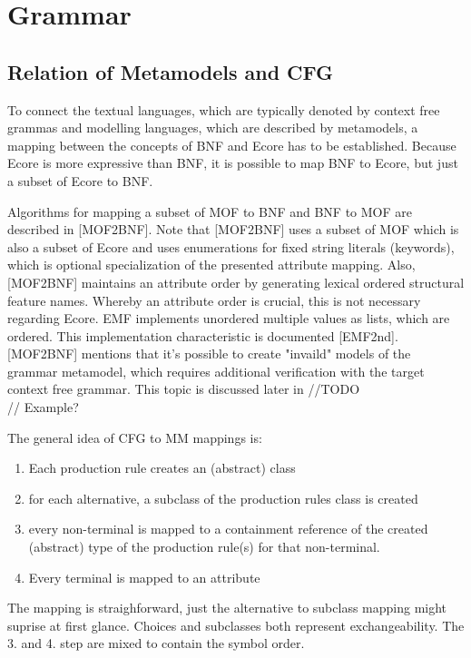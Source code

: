 \chapter{Grammar}
\label{cha:grammar}


\section{Relation of Metamodels and CFG}
To connect the textual languages, which are typically denoted by context free grammas and modelling languages, which are described by metamodels, a mapping between the concepts of BNF and Ecore has to be established. Because Ecore is more expressive than BNF, it is possible to map BNF to Ecore, but just a subset of Ecore to BNF.

Algorithms for mapping a subset of MOF to BNF and BNF to MOF are described in [MOF2BNF]. Note that [MOF2BNF] uses a subset of MOF which is also a subset of Ecore and uses enumerations for fixed string literals (keywords), which is optional specialization of the presented attribute mapping. Also,  [MOF2BNF] maintains an attribute order by generating lexical ordered structural feature names. Whereby an attribute order is crucial, this is not necessary regarding Ecore. EMF implements unordered multiple values as lists, which are ordered. This implementation characteristic is documented [EMF2nd].  [MOF2BNF] mentions that it's possible to create "invaild" models of the grammar metamodel, which requires additional verification with the target context free grammar. This topic is discussed later in //TODO\\ // Example?

The general idea of CFG to MM mappings is:
\begin{enumerate}
	\item Each production rule creates an (abstract) class
	\item for each alternative,  a subclass of the production rules class is created
	\item every non-terminal is mapped to a containment reference of the created (abstract) type of the production rule(s) for that non-terminal.
	\item Every terminal is mapped to an attribute
\end{enumerate}

The mapping is straighforward, just the alternative to subclass mapping might suprise at first glance. Choices and subclasses both represent exchangeability. The 3. and 4. step are mixed to contain the symbol order.

